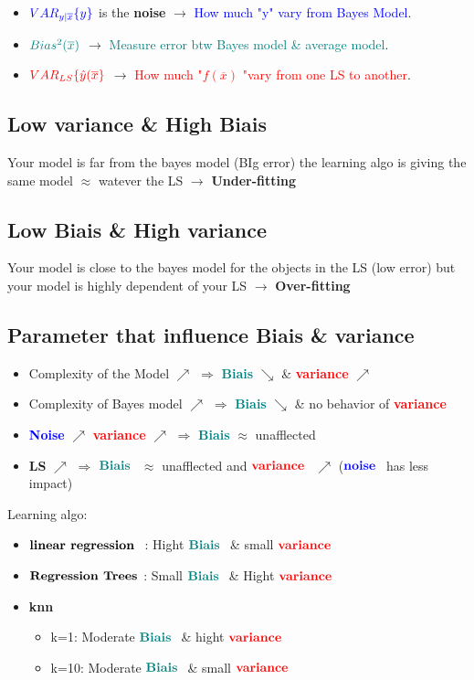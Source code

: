\begin{itemize}
    \item  $\textcolor{blue}{VAR_{y|\overline{x}}\{y\}}$ is the \textbf{noise} $\rightarrow$ \textcolor{blue}{How much "y" vary from Bayes Model}.
    \item $\textcolor{teal}{ Bias^2(\overline{x})}$ $\rightarrow$ \textcolor{teal}{Measure error btw Bayes model \& average model}.
    \item $\textcolor{red}{ VAR_{LS}\{\hat{y}(\overline{x}\}}$ $\rightarrow$ \textcolor{red}{ How much "$f(\overline{x})$ "vary from one LS to another}.
\end{itemize}
\subsection{Low variance \& High Biais}
Your model is far from the bayes model (BIg error) the learning algo is giving the same model $\approx$ watever the LS $\rightarrow$ \textbf{Under-fitting}
\subsection{Low Biais \& High variance}
Your model is close to the bayes model for the objects in the LS (low error) but your model is highly dependent of your LS $\rightarrow$ \textbf{Over-fitting}
\subsection{Parameter that influence Biais \& variance}
\begin{itemize}
    \item Complexity of the Model $\nearrow$ $\Rightarrow$ \textcolor{teal}{\textbf{Biais}} $\searrow$ \&  \textcolor{red}{\textbf{variance}} $\nearrow$
    \item Complexity of Bayes model $\nearrow$ $\Rightarrow$ \textcolor{teal}{\textbf{Biais}} $\searrow$ \& no behavior of \textcolor{red}{\textbf{variance}}
    \item \textcolor{blue}{\textbf{Noise}}  $\nearrow$ \Rightarrow \textcolor{red}{\textbf{variance}} $\nearrow$  $\Rightarrow$  \textcolor{teal}{\textbf{Biais}} $\approx$ unafflected
    \item \textbf{LS} $\nearrow$ $\Rightarrow$ $\textcolor{teal}{\textbf{Biais }}$ $\approx$ unafflected and $\textcolor{red}{\textbf{variance }}$ $\nearrow$ ($\textcolor{blue}{\textbf{noise }}$  has less impact)
\end{itemize}
Learning algo:
\begin{itemize}
    \item $\textbf{linear regression }$ : Hight $\textcolor{teal}{\textbf{Biais }}$ \& small $\textcolor{red}{\textbf{variance }}$
    \item $\textbf{Regression Trees }$: Small $\textcolor{teal}{\textbf{Biais }}$ \& Hight $\textcolor{red}{\textbf{variance }}$
    \item \textbf{knn}
    \begin{itemize}
        \item k=1: Moderate $\textcolor{teal}{\textbf{Biais }}$ \& hight $\textcolor{red}{\textbf{variance }}$
        \item k=10: Moderate $\textcolor{teal}{\textbf{Biais }}$ \& small $\textcolor{red}{\textbf{variance }}$
    \end{itemize}
\end{itemize}